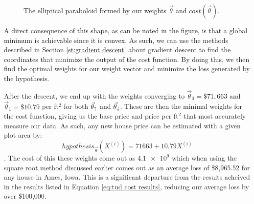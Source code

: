 \begin{figure}[t!]
    \centering
    \caption{The elliptical paraboloid formed by our weights $\vec\theta$ and $cost(\vec\theta)$.}
    \label{fg:cost}
\end{figure}

A direct consequence of this shape, as can be noted in the figure, is that a
global minimum is achievable since it is convex. As such, we can use
the methods described in Section \ref{st:gradient descent} about gradient
descent to find the coordinates that minimize the output of the cost function.
By doing this, we then find the optimal weights for our weight vector and
minimize the loss generated by the hypothesis.

 After the descent, we
end up with the weights converging to $\vec\theta_0 = \$71,663$ and
$\vec\theta_1 = \$10.79$ per ft$^2$ for both $\vec\theta_{\uparrow}$ and $\vec\theta_{\downarrow}$. These are then the
minimal weights for the cost function, giving us the base price and price per
ft$^2$ that most accurately measure our data. As such, any new house price can
be estimated with a given plot area by:
\begin{equation}
    hypothesis_{\vec\theta}(X^{(i)}) = 71663 + 10.79X^{(i)}	
\end{equation}.
The cost of this these weights come out as $\num{4.1e9}$ which when using the
square root method discussed earlier comes out as an average loss of \$8,965.52
for any house in Ames, Iowa. This is a significant departure from the results
acheived in the results listed in Equation \ref{eq:tud cost results}, reducing our
average loss by over \$100,000.



